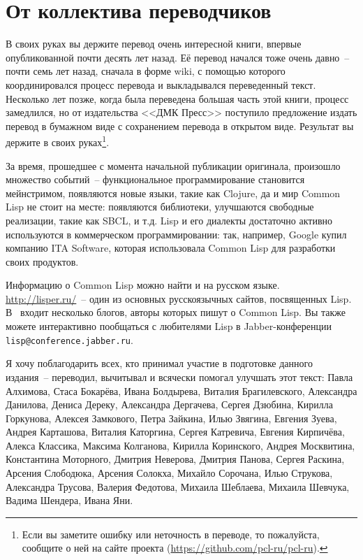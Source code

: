 \chapter*{От коллектива переводчиков}

\thispagestyle{empty}

В своих руках вы держите перевод очень интересной книги, впервые опубликованной почти
десять лет назад.  Её перевод начался тоже очень давно~-- почти семь лет назад, сначала в
форме wiki, с помощью которого координировался процесс перевода и выкладывался переведенный
текст.  Несколько лет позже, когда была переведена большая часть этой книги, процесс
замедлился, но от издательства <<ДМК Пресс>> поступило предложение издать перевод в
бумажном виде с сохранением перевода в открытом виде.  Результат вы держите в своих
руках\footnote{Если вы заметите ошибку или неточность в переводе, то пожалуйста, сообщите
  о ней на сайте проекта (\url{https://github.com/pcl-ru/pcl-ru}).}\hspace{\footnotenegspace}.

За время, прошедшее с момента начальной публикации оригинала, произошло множество событий~--
функциональное программирование становится мейнстримом, появляются новые языки, такие как
Clojure, да
и мир Common Lisp не стоит на месте: появляются библиотеки, улучшаются свободные
реализации, такие как SBCL, и т.д.  Lisp и его диалекты достаточно активно используются в
коммерческом программировании: так, например, Google купил компанию ITA Software, которая
использовала Common Lisp для разработки своих продуктов.

Информацию о Common Lisp можно найти и на русском языке.
\mbox{\url{http://lisper.ru/}}~-- один из основных русскоязычных сайтов, посвященных Lisp.
В~
входит несколько блогов, авторы которых пишут о Common Lisp.  Вы также можете интерактивно
пообщаться с любителями Lisp в Jabber-конференции \verb|lisp@conference.jabber.ru|.

Я хочу поблагодарить всех, кто принимал участие в подготовке данного издания~-- переводил,
вычитывал и всячески помогал улучшать этот текст: Павла Алхимова, Стаса Бокарёва, Ивана
Болдырева, Виталия Брагилевского, Александра Данилова, Дениса Дереку, Александра
Дергачева, Сергея Дзюбина, Кирилла Горкунова, Алексея Замкового, Петра Зайкина, Илью
Звягина, Евгения Зуева, Андрея Карташова, Виталия Каторгина, Сергея Катревича, Евгения
Кирпичёва, Алекса Классика, Максима Колганова, Кирилла Коринского, Андрея Москвитина,
Константина Моторного, Дмитрия Неверова, Дмитрия Панова, Сергея Раскина, Арсения
Слободюка, Арсения Солокха, Михайло Сорочана, Илью Струкова, Александра Трусова, Валерия
Федотова, Михаила Шеблаева, Михаила Шевчука, Вадима Шендера, Ивана Яни.

